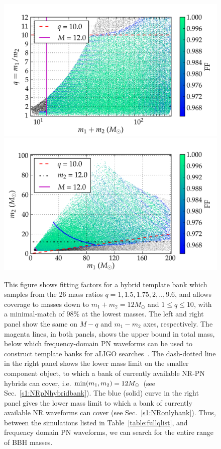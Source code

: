 \begin{figure}
\begin{center}
\includegraphics[width=\columnwidth]{bank_seperate_q1-4-35-4-65-9-6_01_mtot200_match.png}
\includegraphics[width=\columnwidth]{bank_seperate_q1-4-35-4-65-9-6_01_m1m2200_match.png}
\caption{\label{fig:templatebank_halfMassRatios}This figure shows
  fitting factors for a hybrid template bank which samples from the 26 mass
  ratios $q=1,1.5,1.75,2,..,9.6$, and allows coverage to masses down to 
  $m_1 + m_2 = 12M_{\odot}$ and $1\leq q\leq 10$, with a minimal-match of $98\%$
  at the lowest masses. 
  The left and right panel show the same on $M-q$ and $m_1-m_2$ axes, 
  respectively. The magenta lines, in both panels, shows the upper bound 
  in total mass, below which frequency-domain PN waveforms can be used to construct template banks for aLIGO
  searches~\cite{CompTemplates2009,Brown:2012nn}. The dash-dotted line
  in the right panel shows the lower mass limit on the smaller component object,
  to which a bank of currently available NR-PN hybrids can cover, i.e.
  $\mathrm{min}(m_1,m_2)=12M_\odot$ (see Sec.~\ref{s1:NRpNhybridbank}). The blue (solid)
  curve in  the right panel gives the lower mass limit to which a bank of
  currently available NR waveforms can cover (see Sec.~\ref{s1:NRonlybank}).
  Thus, between the simulations listed in Table~\ref{table:fullqlist}, 
  and frequency domain PN waveforms, we can search for the entire range of 
  BBH masses.}
\end{center}
\end{figure}
